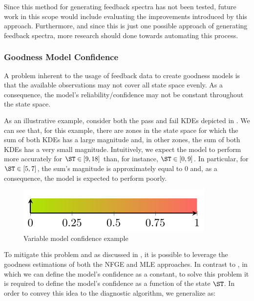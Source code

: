Since this method for generating feedback spectra has not been
tested, future work in this scope would include evaluating the
improvements introduced by this approach.
%
Furthermore, and since this is just one possible approach of
generating feedback spectra, more research should done towards
automating this process.

\subsubsection*{Goodness Model Confidence}
A problem inherent to the usage of feedback data to create goodness
models is that the available observations may not cover all state
space evenly.
%
As a consequence, the model's reliability/confidence may not be
constant throughout the state space.

As an illustrative example, consider both the pass and fail \acp{KDE}
depicted in .
%
We can see that, for this example, there are zones in the state space
for which the sum of both \acp{KDE} has a large magnitude and, in
other zones, the sum of both \acp{KDE} has a very small magnitude.
%
Intuitively, we expect the model to perform more accurately for
$\ST \in [9,18]$ than, for instance, $\ST \in [0,9]$.
%
In particular, for $\ST \in [5,7]$, the sum's magnitude is
approximately equal to $0$ and, as a consequence, the model is
expected to perform poorly.
%

\begin{figure}[!ht]
  \includegraphics[page=7]{figures/conclusions/figures/main.pdf}
  \caption{Variable model confidence example}
  \label{fig:conclusions:model-confidence}
\end{figure}

To mitigate this problem and as discussed in
, it is possible to leverage
the goodness estimations of both the \ac{NFGE} and \ac{MLE}
approaches.
%
In contrast to , in which we can define
the model's confidence as a constant, to solve this problem it is
required to define the model's confidence as a function of the state
$\ST$.
%
In order to convey this idea to the diagnostic algorithm, we
generalize  as:


